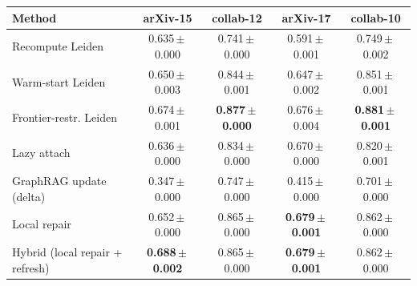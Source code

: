 \begin{tabular}{l cccc}
\toprule
Method & arXiv-15 & collab-12 & arXiv-17 & collab-10\\
\midrule
Recompute Leiden & 0.635\,$\pm$\,0.000 & 0.741\,$\pm$\,0.000 & 0.591\,$\pm$\,0.001 & 0.749\,$\pm$\,0.002 \\
Warm-start Leiden & 0.650\,$\pm$\,0.003 & 0.844\,$\pm$\,0.001 & 0.647\,$\pm$\,0.002 & 0.851\,$\pm$\,0.001 \\
Frontier-restr. Leiden & 0.674\,$\pm$\,0.001 & \textbf{0.877\,$\pm$\,0.000} & 0.676\,$\pm$\,0.004 & \textbf{0.881\,$\pm$\,0.001} \\
Lazy attach & 0.636\,$\pm$\,0.000 & 0.834\,$\pm$\,0.000 & 0.670\,$\pm$\,0.000 & 0.820\,$\pm$\,0.001 \\
GraphRAG update (delta) & 0.347\,$\pm$\,0.000 & 0.747\,$\pm$\,0.000 & 0.415\,$\pm$\,0.000 & 0.701\,$\pm$\,0.000 \\
Local repair & 0.652\,$\pm$\,0.000 & 0.865\,$\pm$\,0.000 & \textbf{0.679\,$\pm$\,0.001} & 0.862\,$\pm$\,0.000 \\
Hybrid (local repair + refresh) & \textbf{0.688\,$\pm$\,0.002} & 0.865\,$\pm$\,0.000 & \textbf{0.679\,$\pm$\,0.001} & 0.862\,$\pm$\,0.000 \\
\bottomrule
\end{tabular}

